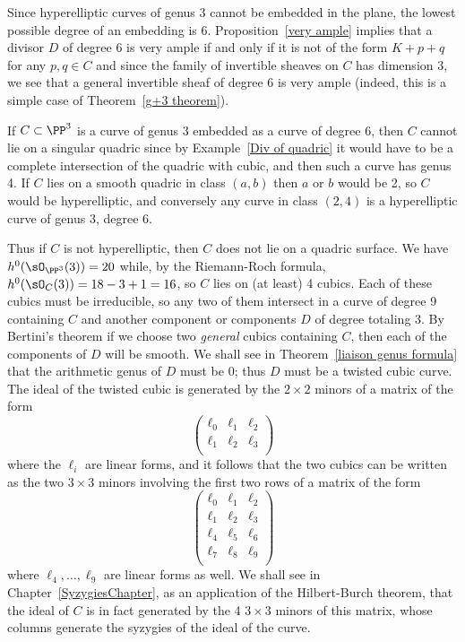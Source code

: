 Since hyperelliptic curves of genus 3 cannot be embedded in the plane, the lowest possible degree of an embedding is 6. Proposition~\ref{very ample} implies that a divisor $D$ of degree 6 is very ample if and only if it is not of the form $K+p+q$ for any $p, q \in C$ and since the family of invertible sheaves on $C$ has dimension 3,  we see that a general invertible sheaf of degree 6 is very ample (indeed, this is a simple case of Theorem~\ref{g+3 theorem}).  

If $C\subset \PP^3$ is a curve of genus 3 embedded as a curve of degree 6, then $C$ cannot lie on a singular quadric since by Example~\ref{Div of quadric} it would
have to be a complete intersection of the quadric with cubic, and then such a curve has genus 4. If $C$ lies on a smooth quadric
in class $(a,b)$ then $a$ or $b$ would be 2, so $C$ would be hyperelliptic, and conversely any curve in class $(2,4)$ 
is a hyperelliptic curve of genus 3, degree 6. 

Thus if $C$ is not hyperelliptic, then $C$ does not lie on a quadric surface. We have $h^0(\sO_{\PP^3}(3)) = 20$ while, by the Riemann-Roch formula, $h^0(\sO_C(3)) = 18-3+1= 16$, so $C$ lies on (at least) 4 cubics. Each of these cubics must be irreducible, so any two of them
intersect in a curve of degree 9 containing $C$ and another component or components $D$ of degree totaling 3. By Bertini's theorem
if we choose two \emph{general} cubics containing $C$, then each of the components of $D$ will be smooth. We shall see in Theorem~\ref{liaison genus formula} that the arithmetic genus of $D$ must be 0; thus $D$ must be a twisted cubic curve. The ideal of the twisted cubic is generated by the $2\times 2$ minors of a matrix of the form
$$
\begin{pmatrix}
 \ell_0& \ell_1&\ell_2\\
 \ell_1& \ell_2&\ell_3\\
\end{pmatrix}
$$
where the $\ell_i$ are linear forms,
and it follows that the two cubics can be written as the two $3\times 3$ minors involving the first two rows of  a matrix of the form
$$
\begin{pmatrix}
 \ell_0& \ell_1&\ell_2\\
 \ell_1& \ell_2&\ell_3\\
\ell_4& \ell_5&\ell_6\\
 \ell_7& \ell_8&\ell_9\\
\end{pmatrix}
$$
where $\ell_4,\dots,\ell_9$ are linear forms as well.
We shall see in Chapter~\ref{SyzygiesChapter}, as an application of the Hilbert-Burch theorem, that the ideal of $C$ is in fact generated by the 4 $3\times 3$ minors of this matrix, whose columns generate
the syzygies of the ideal of the curve.


